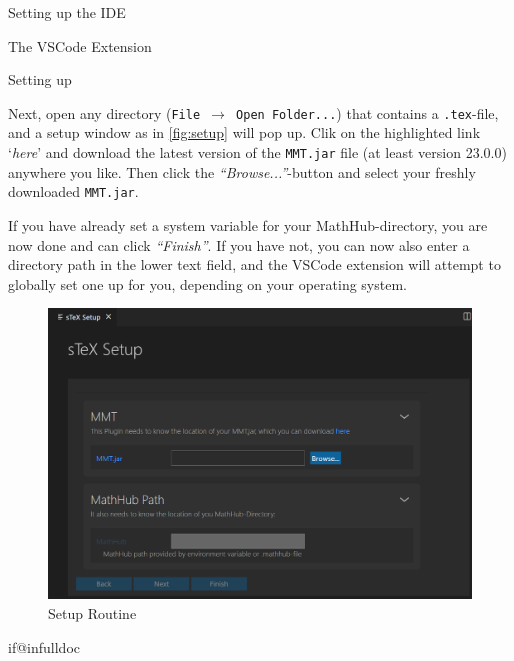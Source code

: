\begin{sfragment}{Setting up the \sTeX IDE}
\begin{sfragment}{The \sTeX VSCode Extension}
  \end{sfragment}

  \begin{sfragment}{Setting up \mmt}

    Next, open any directory (\texttt{File $\to$ Open Folder...}) that contains
    a \verb|.tex|-file, and a setup window as in \autoref{fig:setup} 
    will pop up. Clik on the highlighted link `\emph{here}' and download
    the latest version of the \texttt{MMT.jar} file (at least version 23.0.0)
    anywhere you like. Then click the \emph{``Browse...''}-button
    and select your freshly downloaded \texttt{MMT.jar}.

    If you have already set a system variable for your MathHub-directory,
    you are now done and can click \emph{``Finish''}. If you have not,
    you can now also enter a directory path in the lower text field,
    and the VSCode extension will attempt to globally set one up
    for you, depending on your operating system.

    \begin{figure}
      \begin{center}
        \includegraphics[width=\textwidth]{img/vsc2.png}
      \end{center}
      \caption{\sTeX Setup Routine}\label{fig:setup}
    \end{figure}

  \end{sfragment}

\end{sfragment}

\csname if@infulldoc\endcsname\else
\newpage 
\printbibliography

